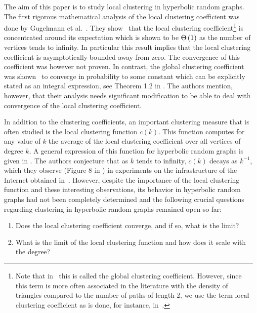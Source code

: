 The aim of this paper is to study local clustering in hyperbolic random graphs. The first rigorous mathematical analysis of the local clustering coefficient was done by Gugelmann et al.~\cite{gugelmann2012random}. They show~\cite[Theorem 2.1]{gugelmann2012random} that the local clustering coefficient\footnote{Note that in~\cite{gugelmann2012random} this is called the global clustering coefficient. However, since this term is more often associated in the literature with the density of triangles compared to the number of paths of length 2, we use the term local clustering coefficient as is done, for instance, in~\cite{candellero2016clustering}.} is concentrated around its expectation which is shown to be $\Theta\left(1\right)$ as the number of vertices tends to infinity. In particular this result implies that the local clustering coefficient is asymptotically bounded away from zero. The convergence of this coefficient was however not proven. In contrast, the global clustering coefficient was shown~\cite{candellero2016clustering} to converge in probability to some constant which can be explicitly stated as an integral expression, see Theorem 1.2 in \cite{candellero2016clustering}. The authors mention, however, that their analysis needs significant modification to be able to deal with convergence of the local clustering coefficient.



In addition to the clustering coefficients, an important clustering measure that is often studied is the local clustering function $c(k)$. This function computes for any value of $k$ the average of the local clustering coefficient over all vertices of degree $k$. A general expression of this function for hyperbolic random graphs is given in \cite[Equation (59)]{krioukov2010hyperbolic}. The authors conjecture that as $k$ tends to infinity, $c(k)$ decays as $k^{-1}$, which they observe (Figure 8 in \cite{krioukov2010hyperbolic}) in experiments on the infrastructure of the Internet obtained in~\cite{claffy2009internet}. However, despite the importance of the local clustering function and these interesting observations, its behavior in hyperbolic random graphs had not been completely determined and the following crucial questions regarding clustering in hyperbolic random graphs remained open so far:
\begin{enumerate}[\upshape 1)]
\item Does the local clustering coefficient converge, and if so, what is the limit?
\item What is the limit of the local clustering function and how does it scale with the degree?
\end{enumerate}

